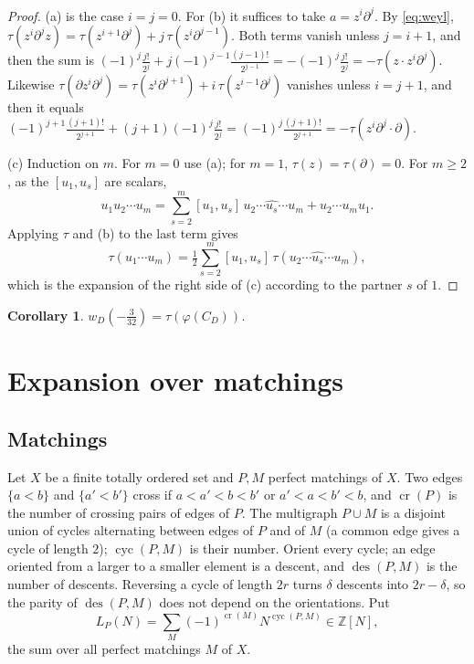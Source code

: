 \documentclass[preprint,12pt]{elsarticle}
\newtheorem{corollary}[theorem]{Corollary}
\theoremstyle{definition}
\newcommand{\Z}{\mathbb{Z}}
\newcommand{\cro}{\operatorname{cr}}
\newcommand{\cyc}{\operatorname{cyc}}
\newcommand{\des}{\operatorname{des}}
\newcommand{\dd}{\partial}
\begin{document}
\begin{proof}
(a) is the case $i=j=0$. For (b) it suffices to take $a=z^i\dd^j$. By \eqref{eq:weyl}, $\tau(z^i\dd^jz)=\tau(z^{i+1}\dd^j)+j\,\tau(z^i\dd^{j-1})$. Both terms vanish unless $j=i+1$, and then the sum is $(-1)^j\frac{j!}{2^j}+j(-1)^{j-1}\frac{(j-1)!}{2^{j-1}}=-(-1)^j\frac{j!}{2^j}=-\tau(z\cdot z^i\dd^j)$. Likewise $\tau(\dd z^i\dd^j)=\tau(z^i\dd^{j+1})+i\,\tau(z^{i-1}\dd^j)$ vanishes unless $i=j+1$, and then it equals $(-1)^{j+1}\frac{(j+1)!}{2^{j+1}}+(j+1)(-1)^j\frac{j!}{2^j}=(-1)^j\frac{(j+1)!}{2^{j+1}}=-\tau(z^i\dd^j\cdot\dd)$.

(c) Induction on $m$. For $m=0$ use (a); for $m=1$, $\tau(z)=\tau(\dd)=0$. For $m\ge2$, as the $[u_1,u_s]$ are scalars,
\[
u_1u_2\cdots u_m=\sum_{s=2}^m[u_1,u_s]\,u_2\cdots\widehat{u_s}\cdots u_m+u_2\cdots u_mu_1 .
\]
Applying $\tau$ and (b) to the last term gives
\[
\tau(u_1\cdots u_m)=\tfrac12\sum_{s=2}^m[u_1,u_s]\,\tau(u_2\cdots\widehat{u_s}\cdots u_m),
\]
which is the expansion of the right side of (c) according to the partner $s$ of $1$.
\end{proof}

\begin{corollary}\label{cor:tau}
$w_D(-\frac{3}{32})=\tau(\varphi(C_D))$.
\end{corollary}

\section{Expansion over matchings}\label{sec:matching}

\subsection{Matchings}
Let $X$ be a finite totally ordered set and $P,M$ perfect matchings of $X$. Two edges $\{a<b\}$ and $\{a'<b'\}$ cross if $a<a'<b<b'$ or $a'<a<b'<b$, and $\cro(P)$ is the number of crossing pairs of edges of $P$. The multigraph $P\cup M$ is a disjoint union of cycles alternating between edges of $P$ and of $M$ (a common edge gives a cycle of length $2$); $\cyc(P,M)$ is their number. Orient every cycle; an edge oriented from a larger to a smaller element is a descent, and $\des(P,M)$ is the number of descents. Reversing a cycle of length $2r$ turns $\delta$ descents into $2r-\delta$, so the parity of $\des(P,M)$ does not depend on the orientations. Put
\[
L_P(N)=\sum_M(-1)^{\cro(M)}N^{\cyc(P,M)}\in\Z[N],
\]
the sum over all perfect matchings $M$ of $X$.
\end{document}
